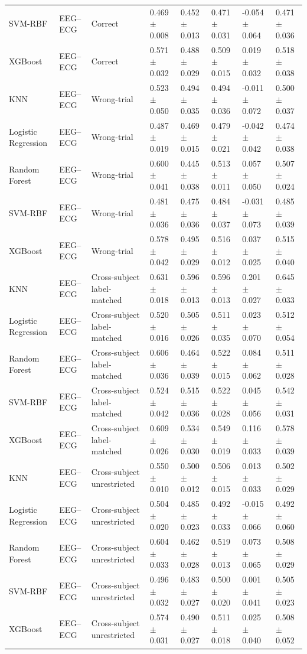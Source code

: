 \begin{table}[!t]
\begin{tabular}{llllllll}
SVM-RBF & EEG--ECG & Correct & 0.469 $\pm$ 0.008 & 0.452 $\pm$ 0.013 & 0.471 $\pm$ 0.031 & -0.054 $\pm$ 0.064 & 0.471 $\pm$ 0.036 \\
XGBoost & EEG--ECG & Correct & 0.571 $\pm$ 0.032 & 0.488 $\pm$ 0.029 & 0.509 $\pm$ 0.015 & 0.019 $\pm$ 0.032 & 0.518 $\pm$ 0.038 \\
KNN & EEG--ECG & Wrong-trial & 0.523 $\pm$ 0.050 & 0.494 $\pm$ 0.035 & 0.494 $\pm$ 0.036 & -0.011 $\pm$ 0.072 & 0.500 $\pm$ 0.037 \\
Logistic Regression & EEG--ECG & Wrong-trial & 0.487 $\pm$ 0.019 & 0.469 $\pm$ 0.015 & 0.479 $\pm$ 0.021 & -0.042 $\pm$ 0.042 & 0.474 $\pm$ 0.038 \\
Random Forest & EEG--ECG & Wrong-trial & 0.600 $\pm$ 0.041 & 0.445 $\pm$ 0.038 & 0.513 $\pm$ 0.011 & 0.057 $\pm$ 0.050 & 0.507 $\pm$ 0.024 \\
SVM-RBF & EEG--ECG & Wrong-trial & 0.481 $\pm$ 0.036 & 0.475 $\pm$ 0.036 & 0.484 $\pm$ 0.037 & -0.031 $\pm$ 0.073 & 0.485 $\pm$ 0.039 \\
XGBoost & EEG--ECG & Wrong-trial & 0.578 $\pm$ 0.042 & 0.495 $\pm$ 0.029 & 0.516 $\pm$ 0.012 & 0.037 $\pm$ 0.025 & 0.515 $\pm$ 0.040 \\
KNN & EEG--ECG & Cross-subject label-matched & 0.631 $\pm$ 0.018 & 0.596 $\pm$ 0.013 & 0.596 $\pm$ 0.013 & 0.201 $\pm$ 0.027 & 0.645 $\pm$ 0.033 \\
Logistic Regression & EEG--ECG & Cross-subject label-matched & 0.520 $\pm$ 0.016 & 0.505 $\pm$ 0.026 & 0.511 $\pm$ 0.035 & 0.023 $\pm$ 0.070 & 0.512 $\pm$ 0.054 \\
Random Forest & EEG--ECG & Cross-subject label-matched & 0.606 $\pm$ 0.036 & 0.464 $\pm$ 0.039 & 0.522 $\pm$ 0.015 & 0.084 $\pm$ 0.062 & 0.511 $\pm$ 0.028 \\
SVM-RBF & EEG--ECG & Cross-subject label-matched & 0.524 $\pm$ 0.042 & 0.515 $\pm$ 0.036 & 0.522 $\pm$ 0.028 & 0.045 $\pm$ 0.056 & 0.542 $\pm$ 0.031 \\
XGBoost & EEG--ECG & Cross-subject label-matched & 0.609 $\pm$ 0.026 & 0.534 $\pm$ 0.030 & 0.549 $\pm$ 0.019 & 0.116 $\pm$ 0.033 & 0.578 $\pm$ 0.039 \\
KNN & EEG--ECG & Cross-subject unrestricted & 0.550 $\pm$ 0.010 & 0.500 $\pm$ 0.012 & 0.506 $\pm$ 0.015 & 0.013 $\pm$ 0.033 & 0.502 $\pm$ 0.029 \\
Logistic Regression & EEG--ECG & Cross-subject unrestricted & 0.504 $\pm$ 0.020 & 0.485 $\pm$ 0.023 & 0.492 $\pm$ 0.033 & -0.015 $\pm$ 0.066 & 0.492 $\pm$ 0.060 \\
Random Forest & EEG--ECG & Cross-subject unrestricted & 0.604 $\pm$ 0.033 & 0.462 $\pm$ 0.028 & 0.519 $\pm$ 0.013 & 0.073 $\pm$ 0.065 & 0.508 $\pm$ 0.029 \\
SVM-RBF & EEG--ECG & Cross-subject unrestricted & 0.496 $\pm$ 0.032 & 0.483 $\pm$ 0.027 & 0.500 $\pm$ 0.020 & 0.001 $\pm$ 0.041 & 0.505 $\pm$ 0.023 \\
XGBoost & EEG--ECG & Cross-subject unrestricted & 0.574 $\pm$ 0.031 & 0.490 $\pm$ 0.027 & 0.511 $\pm$ 0.018 & 0.025 $\pm$ 0.040 & 0.508 $\pm$ 0.052 \\
\bottomrule
\end{tabular}
\end{table}